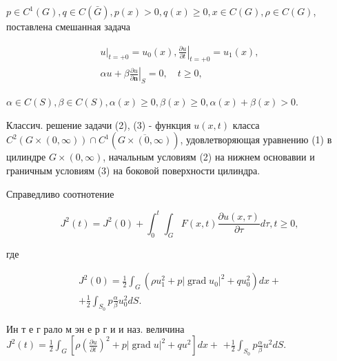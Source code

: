 \documentclass[10pt]{article}
\begin{document}
$p \in C^{1}(G), q \in C(\bar{G}), p(x)>0, q(x) \geqslant 0, x \in C(G), \rho \in C(G)$, поставлена смешанная задача



\[

\begin{gathered}

\left.u\right|_{t=+0}=u_{0}(x),\left.\frac{\partial u}{\partial t}\right|_{t=+0}=u_{1}(x), \\

\alpha u+\left.\beta \frac{\partial u}{\partial \boldsymbol{n}}\right|_{S}=0, \quad t \geqslant 0,

\end{gathered}

\]



$\alpha \in C(S), \beta \in C(S), \alpha(x) \geqslant 0, \beta(x) \geqslant 0, \alpha(x)+\beta(x)>0$.



Классич. решение задачи (2), (3) - функция $u(x, t)$ класса $C^{2}(G \times(0, \infty)) \cap C^{1}(\overline{G \times(0, \infty)})$, удовлетворяющая уравнению (1) в цилиндре $G \times(0, \infty)$, начальным условиям (2) на нижнем основавии и граничным условиям (3) на боковой поверхности цилиндра.



Справедливо соотнотение



\[

J^{2}(t)=J^{2}(0)+\int_{0}^{t} \int_{G} F(x, t) \frac{\partial u(x, \tau)}{\partial \tau} d \tau, t \geqslant 0,

\]



где



\[

\begin{gathered}

J^{2}(0)=\frac{1}{2} \int_{G}\left(\rho u_{1}^{2}+p\left|\operatorname{grad} u_{0}\right|^{2}+q u_{0}^{2}\right) d x+ \\

+\frac{1}{2} \int_{S_{0}} p \frac{\alpha}{\beta} u_{0}^{2} d S .

\end{gathered}

\]



Ин т е г рало м эн е р г и и наз. величина $J^{2}(t)=\frac{1}{2} \int_{G}\left[\rho\left(\frac{\partial u}{\partial t}\right)^{2}+p|\operatorname{grad} u|^{2}+q u^{2}\right] d x+$ $+\frac{1}{2} \int_{S_{0}} p \frac{\alpha}{\beta} u^{2} d S$.
\end{document}

